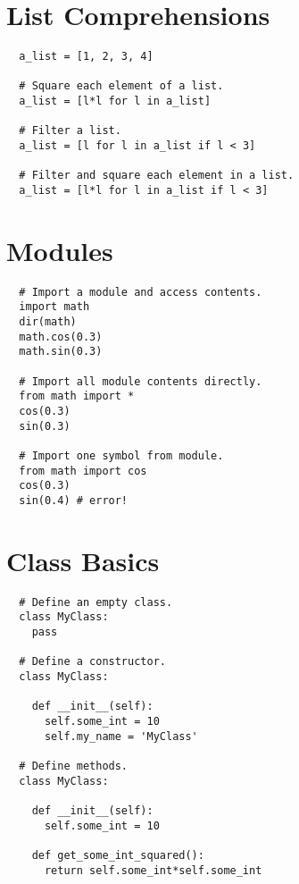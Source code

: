 \documentclass[10pt]{article}
\begin{document}
\section{List Comprehensions}
\begin{lstlisting}
  a_list = [1, 2, 3, 4]

  # Square each element of a list.
  a_list = [l*l for l in a_list]

  # Filter a list.
  a_list = [l for l in a_list if l < 3]

  # Filter and square each element in a list.
  a_list = [l*l for l in a_list if l < 3]
\end{lstlisting}

\section{Modules}
\begin{lstlisting}
  # Import a module and access contents.
  import math
  dir(math)
  math.cos(0.3)
  math.sin(0.3)

  # Import all module contents directly.
  from math import *
  cos(0.3)
  sin(0.3)

  # Import one symbol from module.
  from math import cos
  cos(0.3)
  sin(0.4) # error!
\end{lstlisting}

\section{Class Basics}
\begin{lstlisting}
  # Define an empty class.
  class MyClass:
    pass

  # Define a constructor.
  class MyClass:

    def __init__(self):
      self.some_int = 10
      self.my_name = 'MyClass'

  # Define methods.
  class MyClass:

    def __init__(self):
      self.some_int = 10

    def get_some_int_squared():
      return self.some_int*self.some_int
\end{lstlisting}
\end{document}
